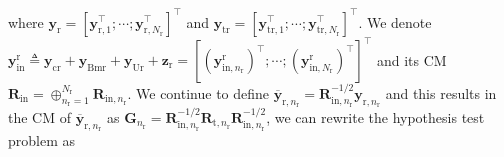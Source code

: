 \documentclass[9pt,journal]{IEEEtran}
\newcommand{\paren}[1]{\left({#1}\right)}
\newcommand{\bracket}[1]{{\left [{#1}\right ]}}
\newcommand{\rr}{_\mathrm{r}}
\newcommand{\sfrac}[2]{#1/#2}
\theoremstyle{definition}
\begin{document}

where $\mathbf{y}_{\mathrm{r}}=\bracket{\mathbf{y}^\top_{\textrm{r},1};\cdots;\mathbf{y}^\top_{\textrm{r},\mathit{N}\rr}}^\top$ and $\mathbf{y}_{\textrm{tr}}=\bracket{\mathbf{y}^\top_{\textrm{tr},1};\cdots;\mathbf{y}^\top_{\textrm{tr},\mathit{N}\rr}}^\top$. We denote $\mathbf{y}^\textrm{r}_{\textrm{in}}\triangleq\mathbf{y}_{\textrm{cr}}+\mathbf{y}_{\textrm{Bmr}}+\mathbf{y}_{\textrm{Ur}}+\mathbf{z}_{\textrm{r}}=\bracket{\paren{\mathbf{y}^{\textrm{r}}_{\textrm{in},n\rr}}^\top;\cdots;\paren{\mathbf{y}^{\textrm{r}}_{\textrm{in},\mathit{N}\rr}}^\top}^\top$ and its CM $\mathbf{R}_{\textrm{in}}=\oplus_{n\rr=1}^{N\rr}\mathbf{R}_{\textrm{in},n\rr}$. We continue to define $\overline{\mathbf{y}}_{\textrm{r},n\rr} = \mathbf{R}^{-\sfrac{1}{2}}_{\textrm{in},n\rr}\mathbf{y}_{\textrm{r},n\rr}$ and this results in the CM of $\overline{\mathbf{y}}_{\textrm{r},n\rr}$ as $\mathbf{G}_{n\rr}=\mathbf{R}^{-\sfrac{1}{2}}_{\textrm{in},n\rr}\mathbf{R}_{\textrm{t},n\rr}\mathbf{R}^{-\sfrac{1}{2}}_{\textrm{in},n\rr}$, we can rewrite the hypothesis test problem as  \par\noindent\small
\end{document}
